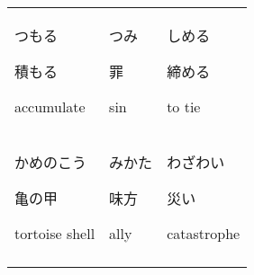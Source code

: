 \documentclass[12pt, a4j, landscape, dvipdfmx]{utarticle}
\begin{document}
\begin{minipage}[t][0pt]{\linewidth }
\begin{tabular}{||p{5.5cm}||p{5.5cm}||p{5.5cm}||}
            \hhline{|:=::=::=:|} \rule{0pt}{3ex}
            \hspace*{-.4cm} {\LARGE つもる}\newline
            \rule{0pt}{3ex} \hspace*{.4cm} {\small
            積もる}\newline \rule{0pt}{3ex} \hspace*{.425cm}
            {\small accumulate}&\rule{0pt}{3ex}
            \hspace*{-.4cm} {\LARGE つみ}\newline
            \rule{0pt}{3ex} \hspace*{.4cm} {\small
            罪}\newline \rule{0pt}{3ex} \hspace*{.425cm}
            {\small sin}&\rule{0pt}{3ex} \hspace*{-.4cm}
            {\LARGE しめる}\newline \rule{0pt}{3ex}
            \hspace*{.4cm} {\small 締める}\newline
            \rule{0pt}{3ex} \hspace*{.425cm} {\small
            to tie}\tabularnewline \hhline{|:=::=::=:|}
            \rule{0pt}{3ex} \hspace*{-.4cm} {\LARGE
            かめのこう}\newline \rule{0pt}{3ex} \hspace*{.4cm}
            {\small 亀の甲}\newline \rule{0pt}{3ex}
            \hspace*{.425cm} {\small
            tortoise shell}&\rule{0pt}{3ex} \hspace*{-.4cm}
            {\LARGE みかた}\newline \rule{0pt}{3ex}
            \hspace*{.4cm} {\small 味方}\newline
            \rule{0pt}{3ex} \hspace*{.425cm} {\small
            ally}&\rule{0pt}{3ex} \hspace*{-.4cm} {\LARGE
            わざわい}\newline \rule{0pt}{3ex} \hspace*{.4cm}
            {\small 災い}\newline \rule{0pt}{3ex}
            \hspace*{.425cm} {\small
            catastrophe}\tabularnewline \hhline{|:=::=::=:|}
            \rule{0pt}{3ex} \hspace*{-.4cm} {\LARGE
}
\end{tabular}
\end{minipage}
\end{document}
